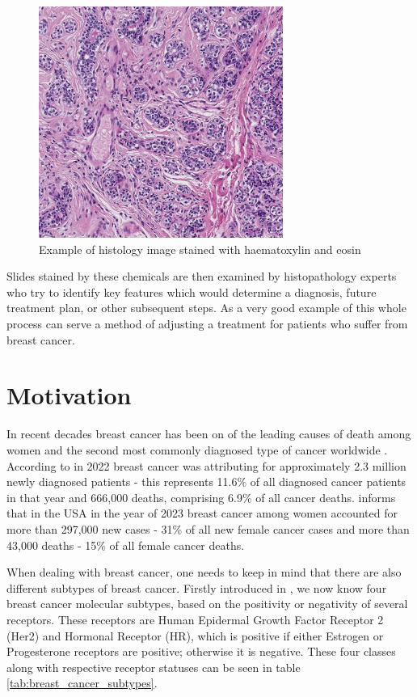 \begin{figure}[h]
\begin{centering}
\includegraphics[width=8cm]{assets/images/histology_image_example.png}
\par\end{centering}
\caption{Example of histology image stained with haematoxylin and eosin \label{fig:h&e-image}}
\end{figure}

Slides stained by these chemicals are then examined by histopathology experts who try to identify key features which would determine a diagnosis, future treatment plan, or other subsequent steps. As a very good example of this whole process can serve a method of adjusting a treatment for patients who suffer from breast cancer.

\section{Motivation}

In recent decades breast cancer has been on of the leading causes of death among women and the second most commonly diagnosed type of cancer worldwide \cite{Bray2024, Siegel2023}. According to \cite{Bray2024} in 2022 breast cancer was attributing for approximately 2.3 million newly diagnosed patients - this represents 11.6\% of all diagnosed cancer patients in that year and 666,000 deaths, comprising 6.9\% of all cancer deaths. \cite{Siegel2023} informs that in the USA in the year of 2023 breast cancer among women accounted for more than 297,000 new cases - 31\% of all new female cancer cases and more than 43,000 deaths - 15\% of all female cancer deaths.

When dealing with breast cancer, one needs to keep in mind that there are also different subtypes of breast cancer. Firstly introduced in \cite{Perou2000}, we now know four breast cancer molecular subtypes, based on the positivity or negativity of several receptors. These receptors are Human Epidermal Growth Factor Receptor 2 (Her2) and Hormonal Receptor (HR), which is positive if either Estrogen or Progesterone receptors are positive; otherwise it is negative. These four classes along with respective receptor statuses can be seen in table \ref{tab:breast_cancer_subtypes}.

